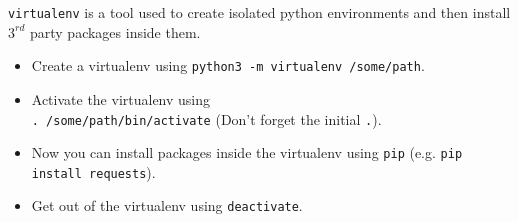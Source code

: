 \texttt{virtualenv} is a tool used to create isolated python
environments and then install $3^{rd}$ party packages inside them.

\begin{itemize}
\item Create a virtualenv using \texttt{python3 -m virtualenv
    /some/path}.
\item Activate the virtualenv using \\ \texttt{. /some/path/bin/activate}
  (Don't forget the initial \texttt{.}).
\item Now you can install packages inside the virtualenv using
  \texttt{pip} (e.g. \texttt{pip install requests}).
\item Get out of the virtualenv using \texttt{deactivate}.
\end{itemize}


